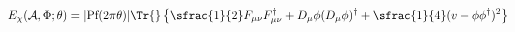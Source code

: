 \begin{equation}
 E_\chi(\mathcal{A},\Phi;\theta)=|\text{Pf}(2\pi\theta)|
 \Tr{}\left\{\sfrac{1}{2}F_{\mu\nu}F_{\mu\nu}^\dagger
 +D_\mu\phi(D_\mu\phi)^\dagger
 +\sfrac{1}{4}(v-\phi\phi^\dagger)^2\right\}
\end{equation}

